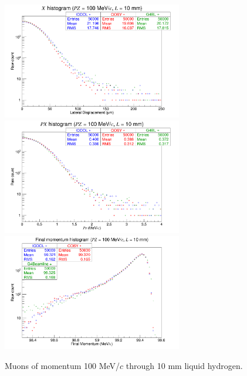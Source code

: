 \begin{figure}[H]
  \centering
    \includegraphics[width=0.7\textwidth]{Benchmarking/LH/X.100.10.png} 
    \includegraphics[width=0.7\textwidth]{Benchmarking/LH/PX.100.10.png} 
    \includegraphics[width=0.7\textwidth]{Benchmarking/LH/strag.100.10.png} 
  \caption{Muons of momentum 100 MeV/$c$ through 10 mm liquid hydrogen.}
  \label{fig:100.10}
\end{figure}

